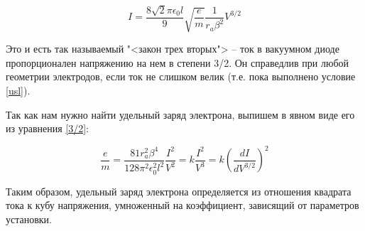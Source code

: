 \documentclass[a4paper, 12pt]{article}%
\begin{document}
	\begin{equation}\label{3/2}
		I = \dfrac{8\sqrt{2}\pi \epsilon_0 l}{9}\sqrt{\dfrac{e}{m}}\dfrac{1}{r_a\beta^2} V^{3/2}
	\end{equation}
	
	Это и есть так называемый "<закон трех вторых"> -- ток в вакуумном диоде пропорционален напряжению на нем в степени 3/2. Он справедлив при любой геометрии электродов, если ток не слишком велик (т.е. пока выполнено условие \eqref{usl}). 
	
	Так как нам нужно найти удельный заряд электрона, выпишем в явном виде его из уравнения \eqref{3/2}:
	
	\begin{equation}\label{e/m}
		\dfrac{e}{m} = \dfrac{81r_a^2\beta^4}{128\pi^2\epsilon_0^2l^2}  \dfrac{I^2}{V^2} = k  \dfrac{I^2}{V^3} = k (\frac{dI}{dV^{3/2}})^2
	\end{equation}
	
	Таким образом, удельный заряд электрона определяется из отношения квадрата тока к кубу напряжения, умноженный на коэффициент, зависящий от параметров установки.
	
\end{document}
